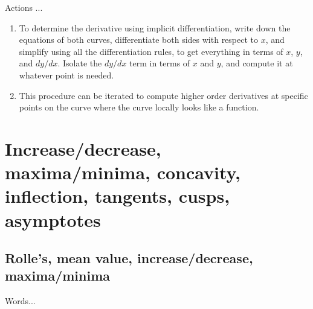 \documentclass[10pt]{amsart}
\begin{document}
Actions ...

\begin{enumerate}
\item To determine the derivative using implicit differentiation,
  write down the equations of both curves, differentiate both sides
  with respect to $x$, and simplify using all the differentiation
  rules, to get everything in terms of $x$, $y$, and $dy/dx$. Isolate
  the $dy/dx$ term in terms of $x$ and $y$, and compute it at whatever
  point is needed.
\item This procedure can be iterated to compute higher order
  derivatives at specific points on the curve where the curve locally
  looks like a function.
\end{enumerate}

\section{Increase/decrease, maxima/minima, concavity, inflection, tangents, cusps, asymptotes}

\subsection{Rolle's, mean value, increase/decrease, maxima/minima}

Words...
\end{document}
